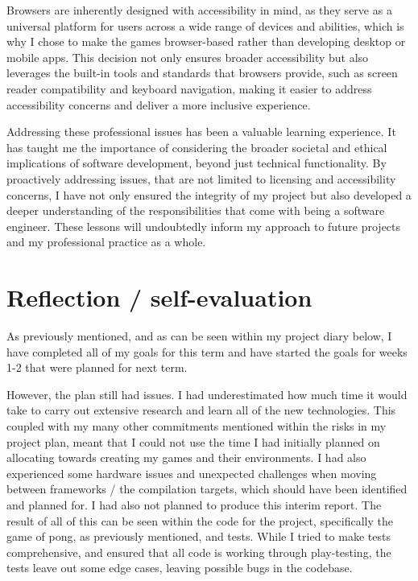\documentclass[]{final}
\begin{document}
Browsers are inherently designed with accessibility in mind, as they serve
as a universal platform for users across a wide range of devices and
abilities, which is why I chose to make the games browser-based rather than
developing desktop or mobile apps. This decision not only ensures broader
accessibility but also leverages the built-in tools and standards that
browsers provide, such as screen reader compatibility and keyboard navigation,
making it easier to address accessibility concerns and deliver a more
inclusive experience.

Addressing these professional issues has been a valuable learning experience.
It has taught me the importance of considering the broader societal and
ethical implications of software development, beyond just technical
functionality. By proactively addressing issues, that are not limited to
licensing and accessibility concerns, I have not only ensured the integrity of my
project but also developed a deeper understanding of the responsibilities
that come with being a software engineer. These lessons will
undoubtedly inform my approach to future projects and my professional
practice as a whole.

\chapter{Reflection / self-evaluation}

As previously mentioned, and as can be seen within my project diary below,
I have completed all of my goals for this term and have
started the goals for weeks 1-2 that were planned for next term.

However, the plan still had issues. I had underestimated how much time it would
take to carry out extensive research and learn all of the new technologies. This
coupled with my many other commitments mentioned within the risks in my project plan,
meant that I could not use the time I had initially planned on allocating towards
creating my games and their environments. I had also experienced some hardware
issues and unexpected challenges when moving between frameworks / the compilation
targets, which should have been identified and planned for. I had also not planned to
produce this interim report. The result of all of this can be seen within the
code for the project, specifically the game of pong, as previously mentioned, and tests. While I tried to make tests comprehensive,
and ensured that all code is working through play-testing, the tests leave out
some edge cases, leaving possible bugs in the codebase.
\end{document}
